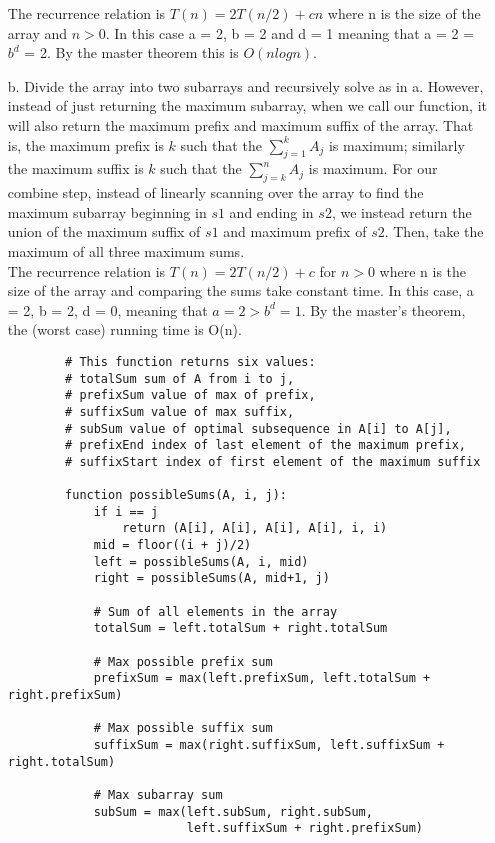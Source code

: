 \documentclass[12pt]{article}
\begin{document}
\begin{enumerate}
    The recurrence relation is $T(n) = 2T(n/2) + cn$ where n is the size of the array and $n>0$. In this case a = 2, b = 2 and d = 1 meaning that a = 2 = $b^d$ = 2. By the master theorem this is $O(nlogn)$.
    \newpage
    \item[b.] Divide the array into two subarrays and recursively solve as in a. However, instead of just returning the maximum subarray, when we call our function, it will also return the maximum prefix and maximum suffix of the array. That is, the maximum prefix is $k$ such that the $\sum_{j=1}^k A_j$ is maximum; similarly the maximum suffix is $k$ such that the $\sum_{j=k}^n A_j$ is maximum. For our combine step, instead of linearly scanning over the array to find the maximum subarray beginning in $s1$ and ending in $s2$, we instead return the union of the maximum 
    suffix of $s1$ and maximum prefix of $s2$. Then, take the maximum of all three maximum sums.\\
    The recurrence relation is $T(n) = 2T(n/2) + c$ for $n>0$ where n is the size of the array and comparing the sums take constant time. In this case, a = 2, b = 2, d = 0, meaning that $a = 2 > b^d = 1$. By the master's theorem, the (worst case) running time is O(n).
    
    \begin{verbatim}
        # This function returns six values: 
        # totalSum sum of A from i to j, 
        # prefixSum value of max of prefix, 
        # suffixSum value of max suffix, 
        # subSum value of optimal subsequence in A[i] to A[j], 
        # prefixEnd index of last element of the maximum prefix, 
        # suffixStart index of first element of the maximum suffix
        
        function possibleSums(A, i, j):
            if i == j
                return (A[i], A[i], A[i], A[i], i, i)
            mid = floor((i + j)/2)
            left = possibleSums(A, i, mid)
            right = possibleSums(A, mid+1, j)

            # Sum of all elements in the array
            totalSum = left.totalSum + right.totalSum

            # Max possible prefix sum
            prefixSum = max(left.prefixSum, left.totalSum + right.prefixSum)

            # Max possible suffix sum
            suffixSum = max(right.suffixSum, left.suffixSum + right.totalSum)

            # Max subarray sum
            subSum = max(left.subSum, right.subSum, 
                         left.suffixSum + right.prefixSum) 


\end{verbatim}
\end{enumerate}
\end{document}
